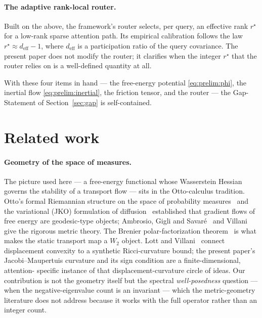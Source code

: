 \documentclass[11pt]{article}
\theoremstyle{plain}
\theoremstyle{definition}
\begin{document}
\paragraph{The adaptive rank-local router.}
\label{sec:multiaxis}
Built on the above, the framework's router selects, per query, an
effective rank $r^\star$ for a low-rank sparse attention path. Its
empirical calibration follows the law $r^\star\approx
d_{\mathrm{eff}}-1$, where $d_{\mathrm{eff}}$ is a participation ratio of
the query covariance. The present paper does not modify the router; it
clarifies when the integer $r^\star$ that the router relies on is a
well-defined quantity at all.

\medskip
\noindent
With these four items in hand --- the free-energy potential
\eqref{eq:prelim:phi}, the inertial flow \eqref{eq:prelim:inertial}, the
friction tensor, and the router --- the Gap-Statement of
Section~\ref{sec:gap} is self-contained.



\section{Related work}
\label{sec:related}

\paragraph{Geometry of the space of measures.}
The picture used here --- a free-energy functional whose Wasserstein
Hessian governs the stability of a transport flow --- sits in the
Otto-calculus tradition. Otto's formal Riemannian structure on the space
of probability measures~\cite{otto2001geometry} and the variational
(JKO) formulation of diffusion~\cite{jordan1998variational} established
that gradient flows of free energy are geodesic-type objects;
Ambrosio, Gigli and Savar\'{e}~\cite{ambrosio2008gradient} and
Villani~\cite{villani2009optimal} give the rigorous metric theory. The
Brenier polar-factorization theorem~\cite{brenier1991polar} is what makes
the static transport map a $W_2$ object. Lott and
Villani~\cite{lott2009ricci} connect displacement convexity to a
synthetic Ricci-curvature bound; the present paper's Jacobi--Maupertuis
curvature and its sign condition are a finite-dimensional, attention-
specific instance of that displacement-curvature circle of ideas. Our
contribution is not the geometry itself but the spectral
\emph{well-posedness} question --- when the negative-eigenvalue count is
an invariant --- which the metric-geometry literature does not address
because it works with the full operator rather than an integer count.
\end{document}
